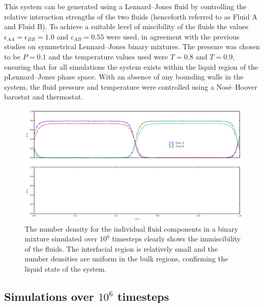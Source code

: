 This system can be generated using a Lennard--Jones fluid by controlling the relative interaction strengths of the two fluids (henceforth referred to as Fluid A and Fluid B).
To achieve a suitable level of miscibility of the fluids the values $\epsilon_{AA} = \epsilon_{BB} = 1.0$ and $\epsilon_{AB}=0.55$ were used, in agreement with the previous studies on symmetrical Lennard--Jones binary mixtures.\cite{MorenzoRazo,Blas}
The pressure was chosen to be $P=0.1$ and the temperature values used were $T=0.8$ and $T=0.9$, ensuring that for all simulations the system exists within the liquid region of the pLennard--Jones phase space.\cite{Smit}
With an absence of any bounding walls in the system, the fluid pressure and temperature were controlled using a Nos\'{e}--Hoover barostat and thermostat.

\begin{figure}[h]
\includegraphics{AABBrho1mill}
\caption{The number density for the individual fluid components in a binary mixture simulated over $10^{6}$ timesteps clearly shows the immiscibility of the fluids. The interfacial region is relatively small and the number densities are uniform in the bulk regions, confirming the liquid state of the system.}
\label{AABBrho1mill}
\end{figure}
\subsection{Simulations over $10^{6}$ timesteps}

